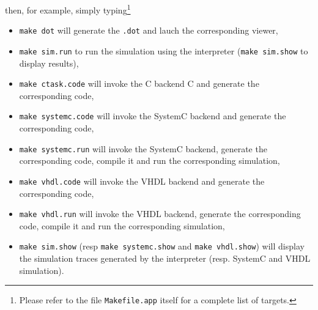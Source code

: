 then, for example, simply typing\footnote{Please refer to the file \texttt{Makefile.app} itself for
  a complete list of targets.}
  \begin{itemize}
  \item \verb|make dot| will generate the \verb|.dot| and lauch the corresponding viewer,
  \item \verb|make sim.run| to run the simulation using the interpreter (\verb|make sim.show| to display results),
  \item \verb|make ctask.code| will invoke the C backend C and generate the corresponding code,
  \item \verb|make systemc.code| will invoke the SystemC backend  and generate the corresponding code,
  \item \verb|make systemc.run| will invoke the SystemC backend, generate the corresponding
    code, compile it and run the corresponding simulation,
  \item \verb|make vhdl.code| will invoke the VHDL backend  and generate the corresponding code,
  \item \verb|make vhdl.run| will invoke the VHDL backend, generate the corresponding
    code, compile it and run the corresponding simulation,
  \item \verb|make sim.show| (resp \verb|make systemc.show| and \verb|make vhdl.show|) will display
    the simulation traces generated by the interpreter (resp. SystemC and VHDL simulation).
  \end{itemize}


